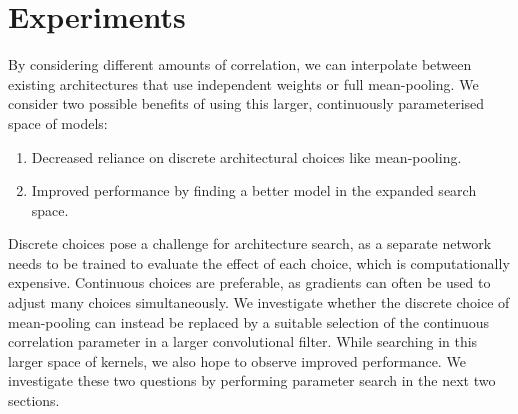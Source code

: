 \documentclass[accepted]{uai2021} %
\newcommand{\0}{\boldsymbol{0}}
\newcommand{\1}{\boldsymbol{1}}
\begin{document}
\section{Experiments}
By considering different amounts of correlation, we can interpolate between existing architectures that use independent weights or full mean-pooling. We consider two possible benefits of using this larger, continuously parameterised space of models:
\begin{enumerate}[label=\textbf{\arabic*)}]
    \item Decreased reliance on discrete architectural choices like mean-pooling.
    \item Improved performance by finding a better model in the expanded search space.
\end{enumerate}

Discrete choices pose a challenge for architecture search, as a separate network needs to be trained to evaluate the effect of each choice, which is computationally expensive. Continuous choices are preferable, as gradients can often be used to adjust many choices simultaneously. We investigate whether the discrete choice of mean-pooling can instead be replaced by a suitable selection of the continuous correlation parameter in a larger convolutional filter. While searching in this larger space of kernels, we also hope to observe improved performance. We investigate these two questions by performing parameter search in the next two sections.


\end{document}
